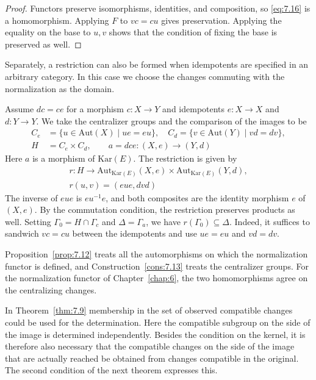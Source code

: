 \begin{proof}

Functors preserve isomorphisms, identities, and composition, so \eqref{eq:7.16} is a
homomorphism.
Applying $F$ to $vc=cu$ gives preservation.
Applying the equality on the base to $u,v$ shows that the condition of fixing the base is
preserved as well.

\end{proof}

Separately, a restriction can also be formed when idempotents are specified in an arbitrary
category.
In this case we choose the changes commuting with the normalization as the domain.

\begin{construction}\label{cons:7.13}

Assume $dc=ce$ for a morphism $c:X\to Y$ and idempotents $e:X\to X$ and $d:Y\to Y$.
We take the centralizer groups and the comparison of the images to be
\begin{equation*}
\begin{aligned}
C_e&=\{u\in\mathrm{Aut}(X)\mid ue=eu\},\quad
C_d=\{v\in\mathrm{Aut}(Y)\mid vd=dv\},\\
H&=C_e\times C_d,\qquad
a=dce:(X,e)\longrightarrow(Y,d)
\end{aligned}
\tag{7.17}\label{eq:7.17}
\end{equation*}
Here $a$ is a morphism of $\mathrm{Kar}(E)$. The restriction is given by
\begin{equation*}
\begin{gathered}
r:H\longrightarrow\mathrm{Aut}_{\mathrm{Kar}(E)}(X,e)
\times\mathrm{Aut}_{\mathrm{Kar}(E)}(Y,d),\\
r(u,v)=(eue,dvd)
\end{gathered}
\tag{7.18}\label{eq:7.18}
\end{equation*}
The inverse of $eue$ is $eu^{-1}e$, and both composites are the identity morphism $e$ of
$(X,e)$.
By the commutation condition, the restriction preserves products as well.
Setting $\Gamma_0=H\cap\Gamma_c$ and $\Delta=\Gamma_a$, we have $r(\Gamma_0)\subseteq\Delta$.
Indeed, it suffices to sandwich $vc=cu$ between the idempotents and use $ue=eu$ and $vd=dv$.

Proposition~\ref{prop:7.12} treats all the automorphisms on which the normalization functor
is defined, and Construction~\ref{cons:7.13} treats the centralizer groups.
For the normalization functor of Chapter~\ref{chap:6}, the two homomorphisms agree on the centralizing changes.

In Theorem~\ref{thm:7.9} membership in the set of observed compatible changes could be used
for the determination.
Here the compatible subgroup on the side of the image is determined independently.
Besides the condition on the kernel, it is therefore also necessary that the compatible
changes on the side of the image that are actually reached be obtained from changes
compatible in the original. The second condition of the next theorem expresses this.

\end{construction}

